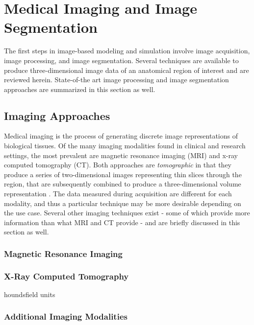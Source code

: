 \chapter{Medical Imaging and Image Segmentation}
%

The first steps in image-based modeling and simulation involve image acquisition, image processing, and image segmentation. Several techniques are available to produce three-dimensional image data of an anatomical region of interest and are reviewed herein. State-of-the art image processing and image segmentation approaches are summarized in this section as well.

\section{Imaging Approaches}
\label{Imaging Approaches}

Medical imaging is the process of generating discrete image representations of biological tissues. Of the many imaging modalities found in clinical and research settings, the most prevalent are magnetic resonance imaging (MRI) and x-ray computed tomography (CT). Both approaches are \textit{tomographic} in that they produce a series of two-dimensional images representing thin slices through the region, that are subsequently combined to produce a three-dimensional volume representation \cite{larobina_murino_2014}. The data measured during acquisition are different for each modality, and thus a particular technique may be more desirable depending on the use case. Several other imaging techniques exist - some of which provide more information than what MRI and CT provide - and are briefly discussed in this section as well.

\subsection{Magnetic Resonance Imaging}
\label{Magnetic Resonance Imaging}



\subsection{X-Ray Computed Tomography}
\label{X-Ray Computed Tomography}

houndsfield units

\subsection{Additional Imaging Modalities}
\label{Other Imaging Modalities}

